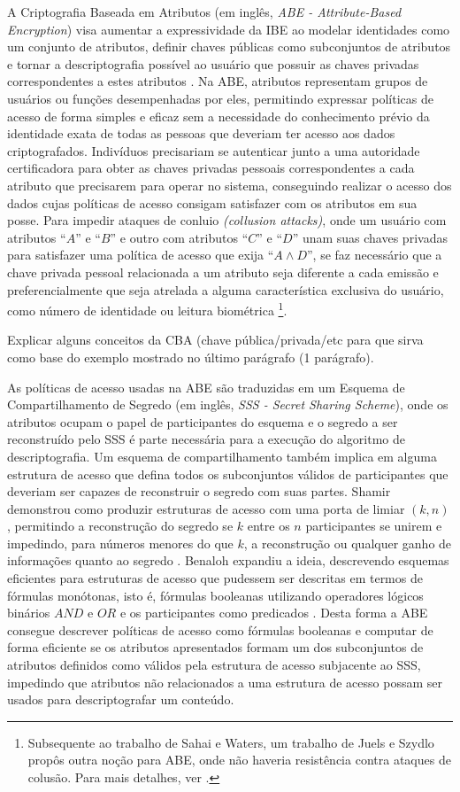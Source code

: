 \documentclass[a4paper,11pt]{article}
\begin{document}
A Criptografia Baseada em Atributos (em inglês, \emph{ABE - Attribute-Based Encryption}) visa aumentar a expressividade da IBE ao modelar identidades como um conjunto de atributos, definir chaves públicas como subconjuntos de atributos e tornar a descriptografia possível ao usuário que possuir as chaves privadas correspondentes a estes atributos \cite{Sahai2005}.
Na ABE, atributos representam grupos de usuários ou funções desempenhadas por eles, permitindo expressar políticas de acesso de forma simples e eficaz sem a necessidade do conhecimento prévio da identidade exata de todas as pessoas que deveriam ter acesso aos dados criptografados.
Indivíduos precisariam se autenticar junto a uma autoridade certificadora para obter as chaves privadas pessoais correspondentes a cada atributo que precisarem para operar no sistema, conseguindo realizar o acesso dos dados cujas políticas de acesso consigam satisfazer com os atributos em sua posse.
Para impedir ataques de conluio \emph{(collusion attacks)}, onde um usuário com atributos ``$A$'' e ``$B$'' e outro com atributos ``$C$'' e ``$D$'' unam suas chaves privadas para satisfazer uma política de acesso que exija ``$A \wedge D$'', se faz necessário que a chave privada pessoal relacionada a um atributo seja diferente a cada emissão e preferencialmente que seja atrelada a alguma característica exclusiva do usuário, como número de identidade ou leitura biométrica \footnote{Subsequente ao trabalho de Sahai e Waters, um trabalho de Juels e Szydlo propôs outra noção para ABE, onde não haveria resistência contra ataques de colusão. Para mais detalhes, ver \cite{Juels2004}.}.

{\color{ForestGreen}Explicar alguns conceitos da CBA (chave pública/privada/etc para que sirva como base do exemplo mostrado no último parágrafo (1 parágrafo).}

As políticas de acesso usadas na ABE são traduzidas em um Esquema de Compartilhamento de Segredo (em inglês, \emph{SSS - Secret Sharing Scheme}), onde os atributos ocupam o papel de participantes do esquema e o segredo a ser reconstruído pelo SSS é parte necessária para a execução do algoritmo de descriptografia.
Um esquema de compartilhamento também implica em alguma estrutura de acesso que defina todos os subconjuntos válidos de participantes que deveriam ser capazes de reconstruir o segredo com suas partes.
Shamir demonstrou como produzir estruturas de acesso com uma porta de limiar $(k,n)$, permitindo a reconstrução do segredo se $k$ entre os $n$ participantes se unirem e impedindo, para números menores do que $k$, a reconstrução ou qualquer ganho de informações quanto ao segredo \cite{Shamir1979}.
Benaloh expandiu a ideia, descrevendo esquemas eficientes para estruturas de acesso que pudessem ser descritas em termos de fórmulas monótonas, isto é, fórmulas booleanas utilizando operadores lógicos binários $AND$ e $OR$ e os participantes como predicados \cite{Benaloh1988}.
Desta forma a ABE consegue descrever políticas de acesso como fórmulas booleanas e computar de forma eficiente se os atributos apresentados formam um dos subconjuntos de atributos definidos como válidos pela estrutura de acesso subjacente ao SSS, impedindo que atributos não relacionados a uma estrutura de acesso possam ser usados para descriptografar um conteúdo.
\end{document}
